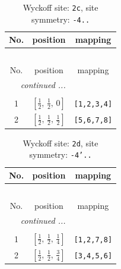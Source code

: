 \documentclass[fleqn,8pt]{jsarticle}
\begin{document}
\begin{longtable}{ccc}
\caption{Wyckoff site: {\tt 2c}, site symmetry: {\tt -4..}}
 \\
 \hline \hline
No. & position & mapping \\ \hline \endfirsthead

\multicolumn{2}{l}{\tablename\ \thetable{}} \\
 \hline \hline
No. & position & mapping \\ \hline \endhead

 \hline \hline
\multicolumn{2}{r}{\footnotesize\it continued ...} \\ \endfoot

 \hline \hline
\multicolumn{2}{r}{} \\ \endlastfoot

1 & $\left[ \frac{1}{2},\, \frac{1}{2},\, 0 \right]$ & {\tt [1,2,3,4]} \\ \hline
2 & $\left[ \frac{1}{2},\, \frac{1}{2},\, \frac{1}{2} \right]$ & {\tt [5,6,7,8]} \\
\end{longtable}
\renewcommand{\arraystretch}{1.2}
\begin{longtable}{ccc}
\caption{Wyckoff site: {\tt 2d}, site symmetry: {\tt -4'..}}
 \\
 \hline \hline
No. & position & mapping \\ \hline \endfirsthead

\multicolumn{2}{l}{\tablename\ \thetable{}} \\
 \hline \hline
No. & position & mapping \\ \hline \endhead

 \hline \hline
\multicolumn{2}{r}{\footnotesize\it continued ...} \\ \endfoot

 \hline \hline
\multicolumn{2}{r}{} \\ \endlastfoot

1 & $\left[ \frac{1}{2},\, \frac{1}{2},\, \frac{1}{4} \right]$ & {\tt [1,2,7,8]} \\ \hline
2 & $\left[ \frac{1}{2},\, \frac{1}{2},\, \frac{3}{4} \right]$ & {\tt [3,4,5,6]} \\
\end{longtable}
\renewcommand{\arraystretch}{1.2}
\end{document}
